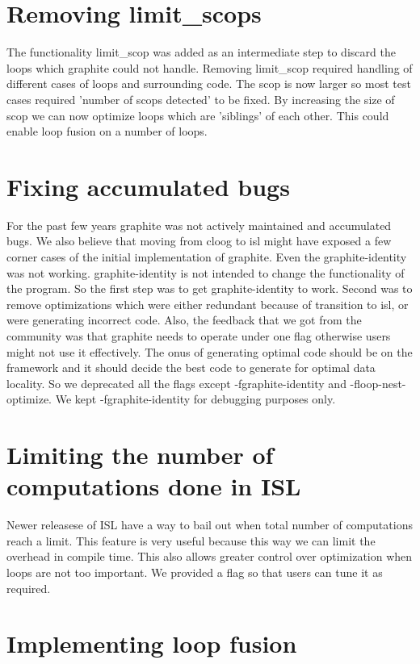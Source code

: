 \section{Removing limit_scops}
The functionality limit_scop was added
as an intermediate step to discard the loops which graphite could not
handle. Removing limit_scop required handling of different cases of loops and
surrounding code.  The scop is now larger so most test cases required 'number of
scops detected' to be fixed. By increasing the size of scop we can now optimize
loops which are 'siblings' of each other. This could enable loop fusion on a
number of loops.

\section{Fixing accumulated bugs}
For the past few years graphite was not actively maintained and accumulated bugs. We also believe that
moving from cloog to isl might have exposed a few corner cases of the initial implementation of graphite.
Even the graphite-identity was not working. graphite-identity is not intended to change the functionality
of the program. So the first step was to get graphite-identity to work. Second was to remove optimizations which
were either redundant because of transition to isl, or were generating incorrect code. Also, the feedback that we
got from the community was that graphite needs to operate under one flag otherwise users might not use it effectively.
The onus of generating optimal code should be on the framework and it should decide the best code to generate
for optimal data locality. So we deprecated all the flags except -fgraphite-identity and -floop-nest-optimize.
We kept -fgraphite-identity for debugging purposes only.

\section{Limiting the number of computations done in ISL}
Newer releasese of ISL have a way to bail out when total number of computations reach a limit.
This feature is very useful because this way we can limit the overhead in compile time. This also
allows greater control over optimization when loops are not too important. We provided a flag so
that users can tune it as required.

\section{Implementing loop fusion}

